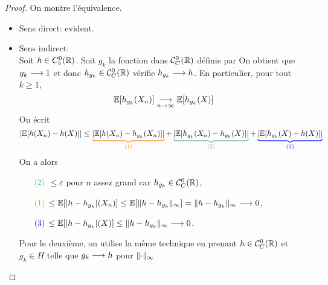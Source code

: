 \begin{proof}
    On montre l'équivalence.\\
    \begin{itemize}[\ptr{}]
        \item Sens direct: evident.

        \item Sens indirect:\\
        Soit \(h\in C_b^0(\mathbb{R})\). Soit \(g_k\) la fonction dans \(\mathcal C_C^0(\mathbb{R})\)
        définie par 
%
%
        On obtient que \(g_k\longrightarrow 1\) et donc \(h_{g_k}\in \mathcal C_C^0(\mathbb{R})\)
        vérifie \(h_{g_k}\longrightarrow h\). En particulier, pour tout \(k\geq 1\),
        \begin{equation*}
            \mathbb{E}[h_{g_k}(X_n)] \underset{n\to\infty}{\longrightarrow} \mathbb{E}[h_{g_k}(X)]
        \end{equation*}
        On écrit
        \begin{equation*}
            \n{\bb E[h(X_n) -h(X)]} 
            \leq \color{orange}\underbrace{\color{black}\n{\bb E[h(X_n) - h_{g_k}(X_n)]}}_{(1)} \color{black}
            + \color{verdant}\underbrace{\color{black}\n{\bb E[h_{g_k}(X_n) - h_{g_k}(X)]}}_{(2)} \color{black}
            + \color{blue}\underbrace{\color{black}\n{\bb E[h_{g_k}(X) - h(X)]}}_{(3)}
        \end{equation*}
        On a alors
        \begin{itemize}
            \item[\(\color{verdant}(2)\)] \(\leq\varepsilon\) pour \(n\) assez grand
            car \(h_{g_k}\in \mathcal C_C^0(\mathbb{R})\),

            \item[\(\color{orange}(1)\)] \(\leq \mathbb{E}[\mathopen{}\left|h-h_{g_k}\right|\mathclose{}(X_n)]\leq \mathbb{E}[\mathopen{}\left\|h-h_{g_k}\right\|\mathclose{}_{\infty}]=\mathopen{}\left\|h-h_{g_k}\right\|\mathclose{}_{\infty}\longrightarrow 0\),

            \item[\(\color{blue}(3)\)] \(\leq \mathbb{E}[\mathopen{}\left|h-h_{g_k}\right|\mathclose{}(X)]\leq \mathopen{}\left\|h-h_{g_k}\right\|\mathclose{}_{\infty}\longrightarrow 0\).
        \end{itemize}
        Pour le deuxième, on utilise la même technique en prenant \(h\in \mathcal C_C^0(\mathbb{R})\)
        et \(g_k\in H\) telle que \(g_k\longrightarrow h\) pour \(\mathopen{}\left\|\cdot\right\|\mathclose{}_\infty\)
    \end{itemize}
\end{proof}


